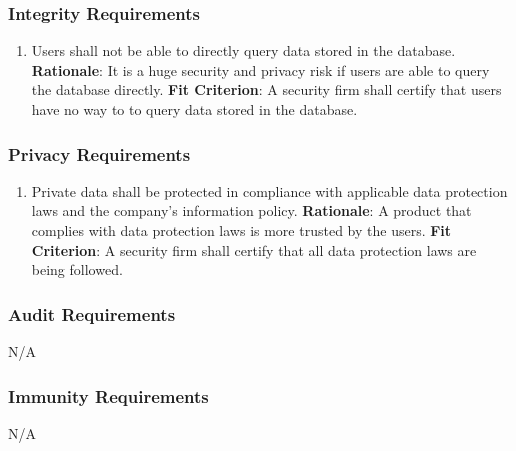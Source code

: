 \documentclass[12pt]{article}
\begin{document}
\subsubsection{Integrity Requirements}
\begin{enumerate}[nfr]
    \item Users shall not be able to directly query data stored in the database.
    \newline \textbf{Rationale}: It is a huge security and privacy risk if users are able to query the database directly.
    \newline \textbf{Fit Criterion}: A security firm shall certify that users have no way to to query data stored in the database.
\end{enumerate}

\subsubsection{Privacy Requirements}
\begin{enumerate}[nfr]
    \item Private data shall be protected in compliance with applicable data protection laws and the company's information policy.
    \newline \textbf{Rationale}: A product that complies with data protection laws is more trusted by the users.
    \newline \textbf{Fit Criterion}: A security firm shall certify that all data protection laws are being followed.
    
\end{enumerate}

\subsubsection{Audit Requirements}
N/A

\subsubsection{Immunity Requirements}
N/A
\end{document}
